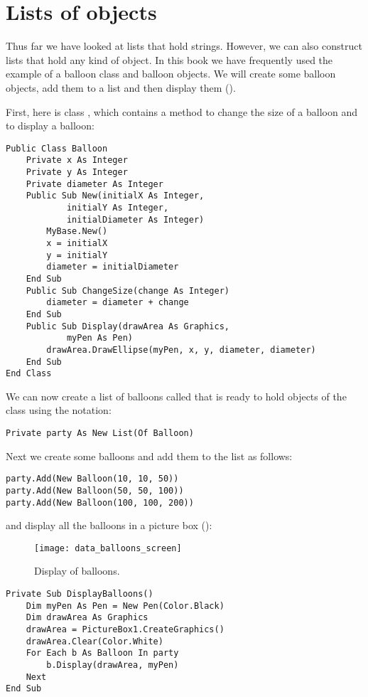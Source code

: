	\section{Lists of objects}
		Thus far we have looked at lists that hold strings. However, we can also construct lists that hold any kind of object. In this book we have frequently used the example of a balloon class and balloon objects. We will create some balloon objects, add them to a list and then display them ().
		
		First, here is class , which contains a method to change the size of a balloon and to display a balloon:
		\begin{lstlisting}
Public Class Balloon
	Private x As Integer
	Private y As Integer
	Private diameter As Integer
	Public Sub New(initialX As Integer,
			initialY As Integer,
			initialDiameter As Integer)
		MyBase.New()
		x = initialX
		y = initialY
		diameter = initialDiameter
	End Sub
	Public Sub ChangeSize(change As Integer)
		diameter = diameter + change
	End Sub
	Public Sub Display(drawArea As Graphics,
			myPen As Pen)
		drawArea.DrawEllipse(myPen, x, y, diameter, diameter)
	End Sub
End Class
		\end{lstlisting}
		We can now create a list of balloons called  that is ready to hold objects of the class  using the  notation:
		\begin{lstlisting}
Private party As New List(Of Balloon)
		\end{lstlisting}
		Next we create some balloons and add them to the list as follows:
		\begin{lstlisting}
party.Add(New Balloon(10, 10, 50))
party.Add(New Balloon(50, 50, 100))
party.Add(New Balloon(100, 100, 200))
		\end{lstlisting}
		and display all the balloons in a picture box ():
		\begin{figure}[bth]
			\centering
			\texttt{[image: data\_balloons\_screen]}
			\caption{Display of balloons.}
			\label{fig:data_balloons_screen}
		\end{figure}
		\begin{lstlisting}
Private Sub DisplayBalloons()
	Dim myPen As Pen = New Pen(Color.Black)
	Dim drawArea As Graphics
	drawArea = PictureBox1.CreateGraphics()
	drawArea.Clear(Color.White)
	For Each b As Balloon In party
		b.Display(drawArea, myPen)
	Next
End Sub
		\end{lstlisting}

